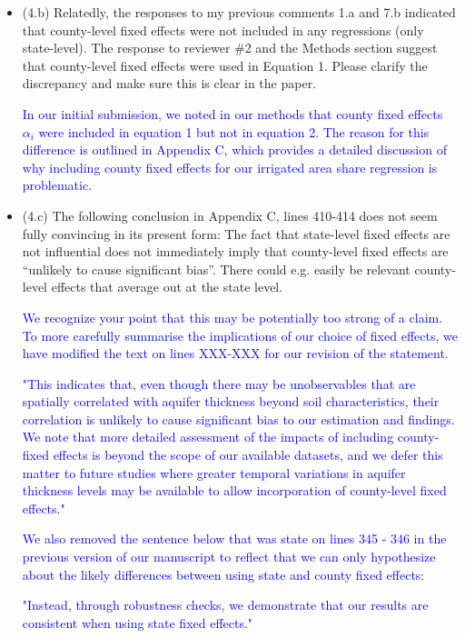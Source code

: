 \documentclass[
]{article}
\begin{document}
\begin{itemize}
\begin{itemize}
  \item (4.b) Relatedly, the responses to my previous comments 1.a and 7.b indicated that county-level fixed effects were not included in any regressions (only state-level). The response to reviewer \#2 and the Methods section suggest that county-level fixed effects were used in Equation 1. Please clarify the discrepancy and make sure this is clear in the paper.

  \textcolor{blue}{In our initial submission, we noted in our methods that county fixed effects $\alpha_i$ were included in equation 1 but not in equation 2. The reason for this difference is outlined in Appendix C, which provides a detailed discussion of why including county fixed effects for our irrigated area share regression is problematic.}
  
  \item (4.c) The following conclusion in Appendix C, lines 410-414 does not seem fully convincing in its present form: The fact that state-level fixed effects are not influential does not immediately imply that county-level fixed effects are ``unlikely to cause significant bias''. There could e.g. easily be relevant county-level effects that average out at the state level.

  \textcolor{blue}{We recognize your point that this may be potentially too strong of a claim. To more carefully summarise the implications of our choice of fixed effects, we have modified the text on lines XXX-XXX for our revision of the statement.}

  \textcolor{blue}{"This indicates that, even though there may be unobservables that are spatially correlated with aquifer thickness beyond soil characteristics, their correlation is unlikely to cause significant bias to our estimation and findings. We note that more detailed assessment of the impacts of including county-fixed effects is beyond the scope of our available datasets, and we defer this matter to future studies where greater temporal variations in aquifer thickness levels may be available to allow incorporation of county-level fixed effects."}

  \textcolor{blue}{We also removed the sentence below that was state on lines 345 - 346 in the previous version of our manuscript to reflect that we can only hypothesize about the likely differences between using state and county fixed effects:}

  \textcolor{blue}{"Instead, through robustness checks, we demonstrate that our results are consistent when using state fixed effects."}


\end{itemize}
\end{itemize}
\end{document}

